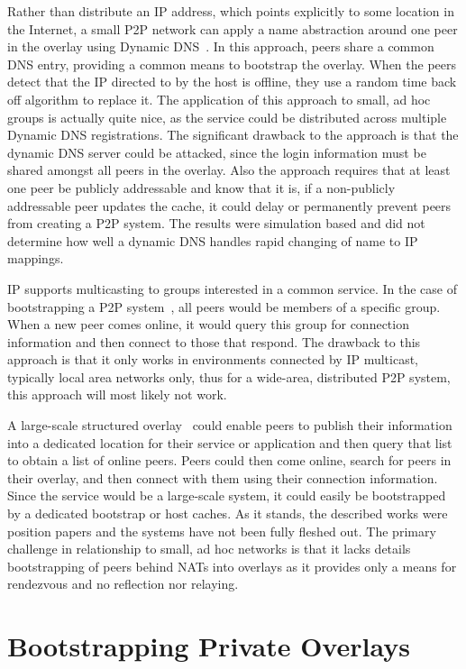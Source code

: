 \documentclass[conference]{IEEEtran}
\begin{document}
Rather than distribute an IP address, which points explicitly to some location
in the Internet, a small P2P network can apply a name abstraction around one
peer in the overlay using Dynamic DNS~\cite{bootstrapping_ddns}.  In this
approach, peers share a common DNS entry, providing a common means to bootstrap
the overlay.  When the peers detect that the IP directed to by the host is
offline, they use a random time back off algorithm to replace it.  The
application of this approach to small, ad hoc groups is actually quite nice, as
the service could be distributed across multiple Dynamic DNS registrations.
The significant drawback to the approach is that the dynamic DNS server could
be attacked, since the login information must be shared amongst all peers in
the overlay.  Also the approach requires that at least one peer be publicly
addressable and know that it is, if a non-publicly addressable peer updates the
cache, it could delay or permanently prevent peers from creating a P2P system.
The results were simulation based and did not determine how well a dynamic DNS
handles rapid changing of name to IP mappings.

IP supports multicasting to groups interested in a common service.  In the case
of bootstrapping a P2P system~\cite{pastry, locality_aware}, all peers would be
members of a specific group.  When a new peer comes online, it would query this
group for connection information and then connect to those that respond.  The
drawback to this approach is that it only works in environments connected by IP
multicast, typically local area networks only, thus for a wide-area,
distributed P2P system, this approach will most likely not work.

A large-scale structured overlay~\cite{one_ring, p2p_bootstrap} could enable
peers to publish their information into a dedicated location for their service
or application and then query that list to obtain a list of online peers.
Peers could then come online, search for peers in their overlay, and then
connect with them using their connection information.  Since the service would
be a large-scale system, it could easily be bootstrapped by a dedicated
bootstrap or host caches.  As it stands, the described works were position
papers and the systems have not been fully fleshed out.  The primary challenge
in relationship to small, ad hoc networks is that it lacks details
bootstrapping of peers behind NATs into overlays as it provides only a means
for rendezvous and no reflection nor relaying.

\section{Bootstrapping Private Overlays}
\label{overview}
\end{document}
